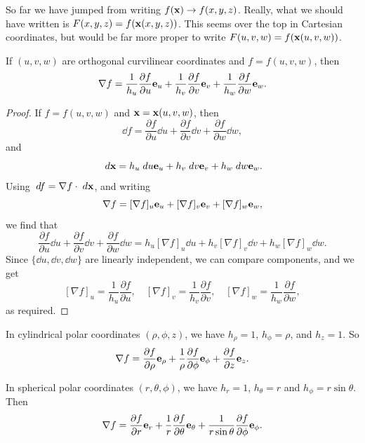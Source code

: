 \documentclass[a4paper]{scrartcl}
\begin{document}
\begin{remark}
	So far we have jumped from writing $f(\mathbf{x}) \rightarrow f(x, y, z)$. Really, what we should have written is $F(x, y, z) = f(\mathbf{x}(x, y, z))$. This seems over the top in Cartesian coordinates, but would be far more proper to write $F(u, v, w) = f(\mathbf{x}(u, v, w))$.
\end{remark}

\begin{proposition}
	If $(u, v, w)$ are orthogonal curvilinear coordinates and $f = f(u, v, w)$, then
	$$
	\nabla f = \frac{1}{h_u} \frac{\partial f}{\partial u} \mathbf{e}_u + \frac{1}{h_v} \frac{\partial f}{\partial v} \mathbf{e}_v + \frac{1}{h_w} \frac{\partial f}{\partial w} \mathbf{e}_w.
	$$
\end{proposition}
\begin{proof}
	If $f = f(u, v, w)$ and $\mathbf{x} = \mathbf{x}(u, v, w)$, then
	$$
\dd f = \frac{\partial f}{\partial u} \dd u + \frac{\partial f}{\partial v} \dd v + \frac{\partial f}{\partial w} \dd w,
	$$
	and
	$$
	\; d \mathbf{x} = h_u \; d u \mathbf{e}_u + h_v \; d v \mathbf{e}_v + h_w \; d w \mathbf{e}_w.
	$$
	Using $\; d f = \nabla f \cdot \; d \mathbf{x}$,  and writing
	$$
	\nabla f = [\nabla f]_u \mathbf{e}_u + [\nabla f]_v \mathbf{e}_v + [\nabla f]_w \mathbf{e}_w,
	$$
	we find that
	$$
	\frac{\partial f}{\partial u} \dd u + \frac{\partial f}{\partial v} \dd v + \frac{\partial f}{\partial w} \dd w = h_u [\nabla f]_u \dd u + h_v [\nabla f]_v \dd v + h_w [\nabla f]_w \dd w.
	$$
	Since $\{\dd u, \dd v, \dd w\}$ are linearly independent, we can compare components, and we get 
	$$
	[\nabla f]_u = \frac{1}{h_u} \frac{\partial f}{\partial u},
	 \quad [\nabla f]_v = \frac{1}{h_v} \frac{\partial f}{\partial v}, 
	\quad [\nabla f]_w = \frac{1}{h_w} \frac{\partial f}{\partial w},
	$$
	as required.
\end{proof}

\begin{example}
	In cylindrical polar coordinates $(\rho, \phi, z)$, we have $h_\rho = 1$, $h_\phi = \rho$, and $h_z = 1$. So
	$$
	\nabla f = \frac{\partial f}{\partial \rho} \mathbf{e}_\rho + \frac{1}{\rho}\frac{\partial f}{\partial \phi} \mathbf{e}_\phi + \frac{\partial f}{\partial z} \mathbf{e}_z.
	$$

	In spherical polar coordinates $(r, \theta, \phi)$, we have $h_r = 1$, $h_\theta = r$ and $h_\phi = r \sin \theta$. Then
	$$
\nabla f = \frac{\partial f}{\partial r} \mathbf{e}_r + \frac{1}{r} \frac{\partial f}{\partial \theta} \mathbf{e}_\theta + \frac{1}{ r \sin \theta} \frac{\partial f}{\partial \phi} \mathbf{e}_\phi.
	$$
\end{example}
\end{document}
